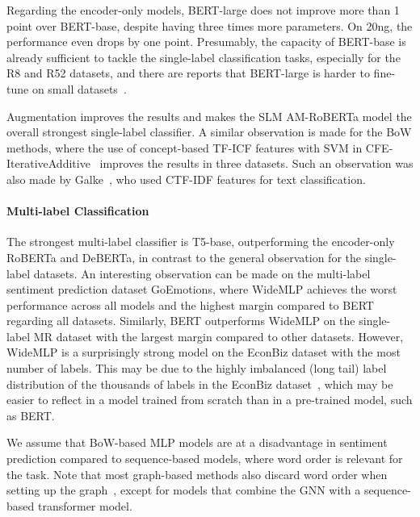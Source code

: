 \documentclass[lettersize,journal]{IEEEtran}
\newcommand{\mlp}{WideMLP\xspace}
\newcommand{\SLM}{SLM\xspace}
\begin{document}
Regarding the encoder-only models, BERT-large does not improve more than 1 point over BERT-base, despite having three times more parameters.
On 20ng, the performance even drops by one point.
Presumably, the capacity of BERT-base is already sufficient to tackle the single-label classification tasks, especially for the R8 and R52 datasets, and there are reports that BERT-large is harder to fine-tune on small datasets~\cite{DBLP:conf/naacl/DevlinCLT19}.

Augmentation improves the results and makes the \SLM AM-RoBERTa model the overall strongest single-label classifier.
A similar observation is made for the BoW methods, where the use of concept-based TF-ICF features with SVM in CFE-IterativeAdditive~\cite{ATTIEH2023110215} improves the results in three datasets. 
Such an observation was also made by Galke~\etal\cite{DBLP:conf/kcap/GalkeMSBS17}, who used CTF-IDF features for text classification.

\paragraph{Multi-label Classification}

The strongest multi-label classifier is T5-base, outperforming the encoder-only RoBERTa and DeBERTa, in contrast to the general observation for the single-label datasets.
An interesting observation can be made on the multi-label sentiment prediction dataset GoEmotions, where \mlp achieves the worst performance across all models and the highest margin compared to BERT regarding all datasets. 
Similarly, BERT outperforms \mlp on the single-label MR dataset with the largest margin compared to other datasets. 
However, \mlp is a surprisingly strong model on the EconBiz dataset with the most number of labels. 
This may be due to the highly imbalanced (long tail) label distribution of the thousands of labels in the EconBiz dataset~\cite{DBLP:conf/jcdl/MaiGS18}, which may be easier to reflect in a model trained from scratch than in a pre-trained model, such as BERT.

We assume that BoW-based MLP models are at a disadvantage in sentiment prediction compared to sequence-based models, where word order is relevant for the task.
Note that most graph-based methods also discard word order when setting up the graph~\cite{galkescherp-acl2022}, except for models that combine the GNN with a sequence-based transformer model.
\end{document}
